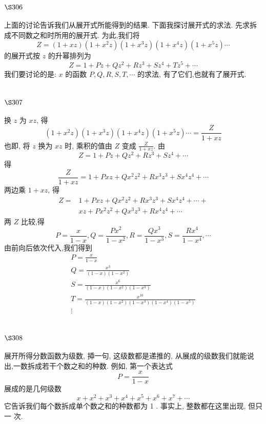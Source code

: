 \section{$\S 306$}

上面的讨论告诉我们从展开式所能得到的结果. 下面我探讨展开式的求法. 先求拆 成不同数之和时所用的展开式. 为此,我们将
\[
Z=(1+x z)\left(1+x^{2} z\right)\left(1+x^{3} z\right)\left(1+x^{4} z\right)\left(1+x^{5} z\right) \cdots
\]
的展开式按 $z$ 的升幂排列为
\[
Z=1+P z+Q z^{2}+R z^{3}+S z^{4}+T z^{5}+\cdots
\]
我们要讨论的是: $x$ 的函数 $P, Q, R, S, T, \cdots$ 的求法, 有了它们,也就有了展开式.

\section{$\S 307$}

换 $z$ 为 $x z$, 得
\[
\left(1+x^{2} z\right)\left(1+x^{3} z\right)\left(1+x^{4} z\right)\left(1+x^{5} z\right) \cdots=\frac{Z}{1+x z}
\]
也即, 将 $z$ 换为 $x z$ 时, 乘积的值由 $Z$ 变成 $\frac{Z}{1+x z}$. 由
\[
Z=1+P z+Q z^{2}+R z^{3}+S z^{4}+\cdots
\]
得
\[
\frac{Z}{1+x z}=1+P x z+Q x^{2} z^{2}+R x^{3} z^{3}+S x^{4} z^{4}+\cdots
\]
两边乘 $1+x z$, 得
\[
\begin{aligned}
Z= & 1+P x z+Q x^{2} z^{2}+R x^{3} z^{3}+S x^{4} z^{4}+\cdots+ \\
& x z+P x^{2} z^{2}+Q x^{3} z^{3}+R x^{4} z^{4}+\cdots
\end{aligned}
\]
两 $Z$ 比较,得
\[
P=\frac{x}{1-x}, Q=\frac{P x^{2}}{1-x^{2}}, R=\frac{Q x^{3}}{1-x^{3}}, S=\frac{R x^{4}}{1-x^{4}}, \cdots
\]
由前向后依次代入,我们得到
\[
\begin{gathered}
P=\frac{x}{1-x} \\
Q=\frac{x^{3}}{(1-x)\left(1-x^{2}\right)} \\
S=\frac{x^{6}}{(1-x)\left(1-x^{2}\right)\left(1-x^{3}\right)} \\
T=\frac{x^{10}}{(1-x)\left(1-x^{2}\right)\left(1-x^{3}\right)\left(1-x^{4}\right)\left(1-x^{5}\right)} \\
\vdots
\end{gathered}
\]
\section{$\S 308$}

展开所得分数函数为级数, 揷一句, 这级数都是递推的, 从展成的级数我们就能说 出,一数拆成若干个数之和的种数. 例如, 第一个表达式
\[
P=\frac{x}{1-x}
\]
展成的是几何级数
\[
x+x^{2}+x^{3}+x^{4}+x^{5}+x^{6}+x^{7}+\cdots
\]
它告诉我们每个数拆成单个数之和的种数都为 1 . 事实上, 整数都在这里出现, 但只一 次.

